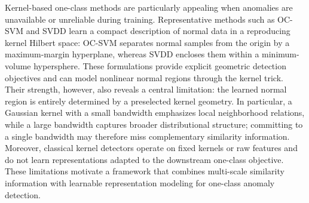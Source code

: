 \documentclass[times, review, 10pt]{elsarticle}
\begin{document}
Kernel-based one-class methods are particularly appealing when anomalies are unavailable or unreliable during training. 
Representative methods such as OC-SVM and SVDD learn a compact description of normal data in a reproducing kernel Hilbert space: 
OC-SVM separates normal samples from the origin by a maximum-margin hyperplane, whereas SVDD encloses them within a minimum-volume 
hypersphere. These formulations provide explicit geometric detection objectives and can model nonlinear normal regions through the 
kernel trick. Their strength, however, also reveals a central limitation: the learned normal region is entirely determined by a 
preselected kernel geometry. In particular, a Gaussian kernel with a small bandwidth emphasizes local neighborhood relations, while 
a large bandwidth captures broader distributional structure; committing to a single bandwidth may therefore miss complementary 
similarity information. Moreover, classical kernel detectors operate on fixed kernels or raw features and do not learn representations 
adapted to the downstream one-class objective. These limitations motivate a framework that combines multi-scale similarity information 
with learnable representation modeling for one-class anomaly detection.
\end{document}
